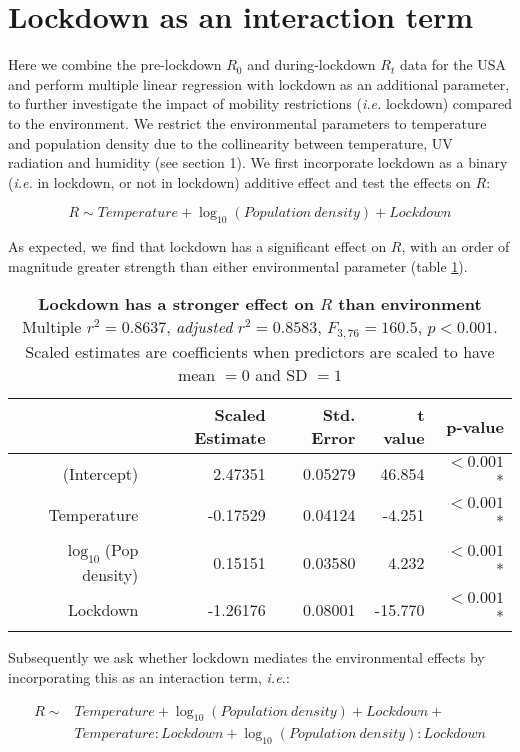 \documentclass[12pt,english,a4paper]{article}
\newcommand{\RO}{$R_0$\xspace}
\begin{document}
\section{Lockdown as an interaction term}

Here we combine the pre-lockdown \RO and during-lockdown $R_t$ data for the USA and perform multiple linear regression with lockdown as an additional parameter, to further investigate the impact of mobility restrictions (\emph{i.e.} lockdown) compared to the environment. We restrict the environmental parameters to temperature and population density due to the collinearity between temperature, UV radiation and humidity (see section 1). We first incorporate lockdown as a binary (\emph{i.e.} in lockdown, or not in lockdown) additive effect and test the effects on $R$:

\begin{equation*}
    R \sim Temperature + \log_{10}(Population\ density) + Lockdown
\end{equation*}

As expected, we find that lockdown has a significant effect on $R$, with an order of magnitude greater strength than either environmental parameter (table \ref{tab:additive_model}).

\begin{table}[ht]
\centering
\caption{{\bf Lockdown has a stronger effect on $R$ than environment} Multiple $r^2 = 0.8637$, \textsl{adjusted} $r^2 = 0.8583$, $F_{3,76} = 160.5$, $p < 0.001$. Scaled estimates are coefficients when predictors are scaled to have mean $= 0$ and SD $= 1$}
\begin{tabular}{rrrrr}
  \hline
 & Scaled Estimate & Std. Error & t value & p-value \\ 
  \hline
 (Intercept) & 2.47351 & 0.05279 & 46.854 & $< 0.001$* \\ 
  Temperature & -0.17529 & 0.04124 & -4.251 & $< 0.001$* \\ 
  $\log_{10}$(Pop density) & 0.15151 & 0.03580 & 4.232 & $< 0.001$* \\ 
  Lockdown & -1.26176 & 0.08001 & -15.770 & $< 0.001$* \\ 
   \hline
\end{tabular}
\label{tab:additive_model}
\end{table}

Subsequently we ask whether lockdown mediates the environmental effects by incorporating this as an interaction term, \emph{i.e.}:

\begin{equation*}
\begin{aligned}
    R \sim{} & Temperature + \log_{10}(Population\ density) + Lockdown + \\
             &  Temperature:Lockdown + \log_{10}(Population\ density):Lockdown 
\end{aligned}
\end{equation*}
\end{document}
